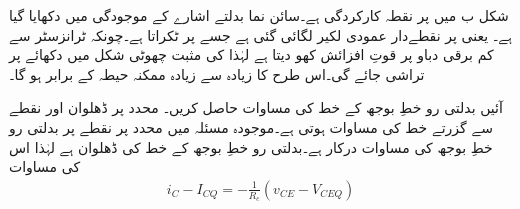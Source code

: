 شکل  ب میں  پر  نقطہ کارکردگی ہے۔سائن نما بدلتے اشارے کے موجودگی میں  دکھایا گیا ہے۔ یعنی  پر نقطےدار عمودی لکیر لگائی گئی ہے جسے    پر ٹکراتا ہے۔چونکہ ٹرانزسٹر  سے کم برقی دباو پر قوتِ افزائش کھو دیتا ہے لہٰذا  کی مثبت چھوٹی شکل میں دکھائے  پر تراشی جائے گی۔اس طرح  کا زیادہ سے زیادہ ممکنہ حیطہ  کے برابر ہو گا۔

آئیں بدلتی رو خطِ بوجھ کے خط کی مساوات حاصل کریں۔ محدد پر  ڈھلوان اور نقطے سے گزرتے خط کی مساوات  ہوتی ہے۔موجودہ مسئلہ میں  محدد پر نقطے پر بدلتی رو خطِ بوجھ کی مساوات درکار ہے۔بدلتی رو خطِ بوجھ کے خط کی ڈھلوان  ہے لہٰذا اس کی مساوات
\begin{align}\label{مساوات_ٹرانزسٹر_بدلتا_بار_خط_مساوات}
i_C-I_{CQ}=-\frac{1}{R_c} \left(v_{CE}-V_{CEQ} \right)
\end{align} 

